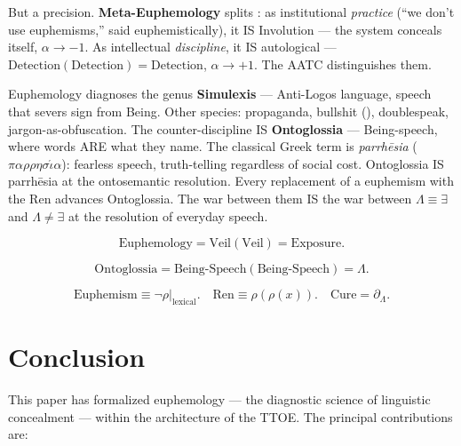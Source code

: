 \documentclass[11pt, oneside]{article}
\theoremstyle{definition}
\begin{document}
But a precision. \textbf{Meta-Euphemology} splits \cite{codex2}: as institutional \textit{practice} (``we don't use euphemisms,'' said euphemistically), it IS Involution --- the system conceals itself, $\alpha \to -1$. As intellectual \textit{discipline}, it IS autological --- $\text{Detection}(\text{Detection}) = \text{Detection}$, $\alpha \to +1$. The AATC distinguishes them.

Euphemology diagnoses the genus \textbf{Simulexis} --- Anti-Logos language, speech that severs sign from Being. Other species: propaganda, bullshit (\cite{frankfurt}), doublespeak, jargon-as-obfuscation. The counter-discipline IS \textbf{Ontoglossia} --- Being-speech, where words ARE what they name. The classical Greek term is \textit{parrh\={e}sia} ($\pi\alpha\rho\rho\eta\sigma\acute{\iota}\alpha$): fearless speech, truth-telling regardless of social cost. Ontoglossia IS parrh\={e}sia at the ontosemantic resolution. Every replacement of a euphemism with the Ren advances Ontoglossia. The war between them IS the war between $\Lambda \equiv \exists$ and $\Lambda \neq \exists$ at the resolution of everyday speech.

$$\boxed{\text{Euphemology} = \text{Veil}(\text{Veil}) = \text{Exposure}.}$$

$$\boxed{\text{Ontoglossia} = \text{Being-Speech}(\text{Being-Speech}) = \Lambda.}$$

$$\boxed{\text{Euphemism} \equiv \neg\rho|_{\text{lexical}}. \quad \text{Ren} \equiv \rho(\rho(x)). \quad \text{Cure} = \partial_\Lambda.}$$

\section{Conclusion}

This paper has formalized euphemology --- the diagnostic science of linguistic concealment --- within the architecture of the TTOE. The principal contributions are:
\end{document}
